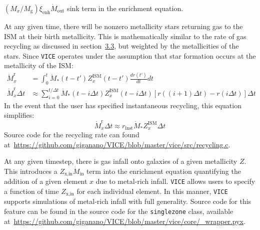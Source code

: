 \documentclass{report}
\begin{document}
$(M_x/M_\text{g})\xi_\text{enh}\dot{M}_\text{out}$ sink term in the enrichment 
equation. 
\par 
At any given time, there will be nonzero metallicity stars returning gas to 
the ISM at their birth metallicity. This is mathematically similar to the rate 
of gas recycling as discussed in section~\hyperlink{gas:recycling}{3.3}, but 
weighted by the metallicities of the stars. Since \texttt{VICE} operates under 
the assumption that star formation occurs at the metallicity of the ISM: 
\begin{equation}\begin{split}
\dot{M}_x^\text{r} &= \int_0^t \dot{M}_*(t - t')Z_x^\text{ISM}(t - t')
\frac{dr(t')}{dt}dt \\
\dot{M}_x^\text{r}\Delta t &\approx \sum_{i = 0}^{t/\Delta t}
\dot{M}_*(t - i\Delta t)Z_x^\text{ISM}(t - i\Delta t)
[r((i + 1)\Delta t) - r(i\Delta t)]\Delta t
\end{split}\end{equation}
In the event that the user has specified instantaneous recycling, this 
equation simplifies: 
\begin{equation}
\dot{M}_x^\text{r}\Delta t \approx r_\text{inst}\dot{M}_*Z_x^\text{ISM}\Delta t
\end{equation} 
Source code for the recycling rate can found 
at~\url{https://github.com/giganano/VICE/blob/master/vice/src/recycling.c}. 
\par
At any given timestep, there is gas infall onto galaxies of a given metallicity 
$Z$. This introduces a $Z_\text{x,in}\dot{M}_\text{in}$ term into the 
enrichment equation quantifying the addition of a given element $x$ due to 
metal-rich infall. \texttt{VICE} allows users to specify a function of time 
$Z_\text{x,in}$ for each individual element. In this manner, \texttt{VICE} 
supports simulations of metal-rich infall with full generality. Source code 
for this feature can be found in the source code for the \texttt{singlezone} 
class, available 
at~\url{https://github.com/giganano/VICE/blob/master/vice/core/_wrapper.pyx}. 
\end{document}
